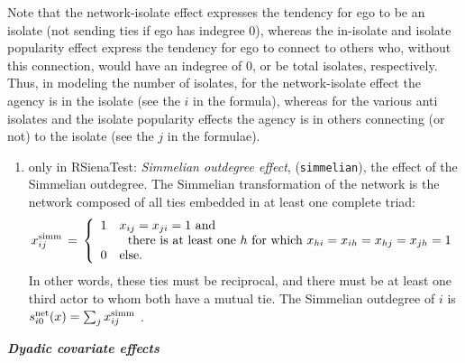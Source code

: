 \documentclass[a4paper,fleqn,11pt]{article}
\newcommand{\+}{\, + \,}
\newcommand{\vit}{\theenumi}
\newcounter{savenumi}
\begin{document}
      Note that the network-isolate effect expresses the tendency for ego
      to be an isolate (not sending ties if ego has indegree 0),
      whereas the in-isolate and
      isolate popularity effect express the tendency for ego
      to connect to others who, without this connection, would
      have an indegree of 0, or be total isolates, respectively.
      Thus, in modeling the number of isolates, for the network-isolate
      effect the agency is in the isolate (see the $i$ in the formula),
      whereas for the various anti isolates and the isolate popularity
      effects the agency is in others connecting (or not)
      to the isolate (see the $j$ in the formulae).

\begin{enumerate}
\setcounter{enumi}{\value{savenumi}}
\item only in \textsf{RSienaTest}: \emph{Simmelian outdegree effect}, (\texttt{simmelian}), the effect of
      the Simmelian outdegree. The Simmelian transformation of the network is
      the network composed of all ties embedded in at least one complete triad:
\[
    x^{\rm{simm}}_{ij} \,=\, \left\{ \begin{array}{cl}
                               1 & x_{ij} = x_{ji} = 1 \text{ and} \\
                                  & \ \text{ there is at least one }
                                      h \text{ for which } x_{hi} = x_{ih} = x_{hj} = x_{jh} = 1 \\
                               0 & \text{else.}
                             \end{array} \right.
\]
      In other words, these ties must be reciprocal, and there must be at least one
      third actor to whom both have a mutual tie.
      The Simmelian outdegree of $i$ is  \\
$s^{\rm net}_{i\vit}(x ) = \sum_j  x^{\rm{simm}}_{ij} $ .\\

\setcounter{savenumi}{\value{enumi}}
\end{enumerate}
\medskip

\noindent
\textbf{\emph{Dyadic covariate effects}}
\medskip
\end{document}
